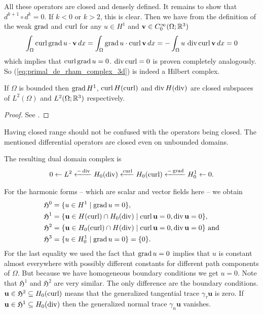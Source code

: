\documentclass[../master_thesis.tex]{subfiles}
\begin{document}
All these operators are closed and densely defined. It remains to show that 
$d^{k+1} \circ d^k = 0$. If $k < 0$ or $k>2$, this is clear. 
Then we have from the definition of the weak $\operatorname{grad}$ and $\operatorname{curl}$
for any $u \in H^1$ and $\mathbf{v} \in C^\infty_0(\Omega;\mathbb{R}^3)$  
\begin{align*}
    \int_\Omega \operatorname{curl} \operatorname{grad} u \cdot \mathbf{v} \, dx 
    = \int_\Omega \operatorname{grad} u \cdot \operatorname{curl} \mathbf{v} \, dx 
    = -\int_\Omega u \, \operatorname{div} \operatorname{curl} \mathbf{v} \, dx
    = 0
\end{align*}
which implies that $\operatorname{curl} \operatorname{grad} u = 0$. $\operatorname{div} \operatorname{curl} = 0$ is proven 
completely analogously. So (\ref{eq:primal_de_rham_complex_3d}) is indeed a 
Hilbert complex. 

\begin{theorem}\label{thm:closed_range}
    If $\Omega$ is bounded then $\operatorname{grad} H^1$, $\operatorname{curl} H(\operatorname{curl})$ and 
    $\operatorname{div} H(\operatorname{div})$ are closed subspaces of $L^2(\Omega)$ and 
    $L^2(\Omega;\mathbb{R}^3)$ respectively.
\end{theorem}
\begin{proof}
    See \cite[p.38]{arnold}.
\end{proof}
Having closed range should not be confused with the operators being closed.
The mentioned differential operators are closed even on unbounded domains.

The resulting dual domain complex is 
\begin{align*}
    0 \leftarrow L^2 \xleftarrow{-\operatorname{div}} H_0(\operatorname{div})
        \xleftarrow{\operatorname{curl}} H_0(\operatorname{curl}) 
        \xleftarrow{-\operatorname{grad}} H^1_0 \leftarrow 0.
\end{align*}

For the harmonic forms -- which are scalar and vector fields here -- 
we obtain
\begin{align*}
    \mathfrak{H}^0 &= \{ u \in H^1 \mid \operatorname{grad} u = 0\},
    \\ \mathfrak{H}^1 &= \{ \mathbf{u} \in H(\operatorname{curl}) \cap H_0(\operatorname{div})
        \mid \operatorname{curl} \mathbf{u} = 0, \operatorname{div} \mathbf{u} = 0\},
    \\ \mathfrak{H}^2 &= \{ \mathbf{u} \in H_0(\operatorname{curl}) \cap H(\operatorname{div})
        \mid \operatorname{curl} \mathbf{u} = 0, \operatorname{div} \mathbf{u} = 0\} \text{ and}
    \\ \mathfrak{H}^3 &= \{ u \in H^1_0
       \mid \operatorname{grad} u = 0\} = \{0\}.
\end{align*}
For the last equality we used the fact that $\operatorname{grad} u = 0$ implies that 
$u$ is constant almost everywhere with possibly different constants for 
different path components of $\Omega$. But because we have homogeneous boundary 
conditions we get $u=0$. Note that $\mathfrak{H}^1$ and $\mathfrak{H}^2$ 
are very similar. The only difference are the boundary conditions. 
$\mathbf{u} \in \mathfrak{H}^2 \subseteq H_0(\operatorname{curl})$ 
means that the generalized tangential 
trace $\gamma_\tau \mathbf{u}$ is zero. If $\mathbf{u}  \in \mathfrak{H}^1 
\subseteq H_0(\operatorname{div})$ 
then the 
generalized normal trace $\gamma_n \mathbf{u}$ vanishes.
\end{document}
